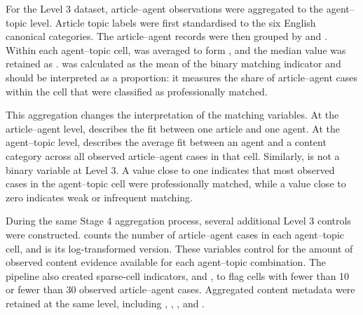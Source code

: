 For the Level 3 dataset, article–agent observations were aggregated to the agent–topic level. Article topic labels were first standardised to the six English canonical categories. The article–agent records were then grouped by  and . Within each agent–topic cell,  was averaged to form , and the median value was retained as .  was calculated as the mean of the binary matching indicator and should be interpreted as a proportion: it measures the share of article–agent cases within the cell that were classified as professionally matched.

This aggregation changes the interpretation of the matching variables. At the article–agent level,  describes the fit between one article and one agent. At the agent–topic level,  describes the average fit between an agent and a content category across all observed article–agent cases in that cell. Similarly,  is not a binary variable at Level 3. A value close to one indicates that most observed cases in the agent–topic cell were professionally matched, while a value close to zero indicates weak or infrequent matching.

During the same Stage 4 aggregation process, several additional Level 3 controls were constructed.  counts the number of article–agent cases in each agent–topic cell, and  is its log-transformed version. These variables control for the amount of observed content evidence available for each agent–topic combination. The pipeline also created sparse-cell indicators,  and , to flag cells with fewer than 10 or fewer than 30 observed article–agent cases. Aggregated content metadata were retained at the same level, including , , , and .

